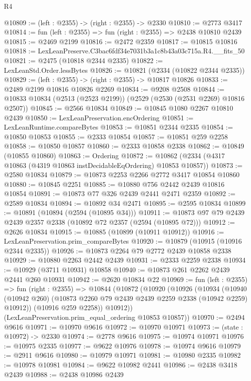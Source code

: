 \begin{lexlean}{R4}
\begin{coremodule}
@10809 := (left : @2355) -> (right : @2355) -> @2330
@10810 := @2773 @3417
@10814 := fun (left : @2355) => fun (right : @2355) => @2438 @10810 @2439
@10815 := @2469 @2199
@10816 := @2472 @2359
@10817 := @10815 @10816
@10818 := LexLeanPreserve.C3bac6fdf34e7031b3a1c8b43a03c715a.R4.__fits_50
@10821 := @2475 (@10818 @2344 @2335)
@10822 := LexLeanStd.Order.lessBytes
@10826 := @10821 (@2334 (@10822 @2344 @2335))
@10829 := (left : @2355) -> (right : @2355) -> @10817 @10826
@10833 := @2489 @2199 @10816 @10826 @2269
@10834 := @9208 @2508
@10844 := @10833 @10834 (@2513 (@2523 @2199)) (@2529 (@2530 (@2531 @2269) @10816 @2507))
@10845 := @2566 @10834
@10849 := @10845 @1080 @2267 @10810 @2439
@10850 := LexLeanPreservation.encOrdering
@10851 := LexLeanRuntime.compareBytes
@10853 := @10851 @2344 @2335
@10854 := @10850 @10853
@10855 := @2333 @10854
@10857 := @10851 @259 @2258
@10858 := @10850 @10857
@10860 := @2333 @10858 @2338
@10862 := @10849 (@10855 @10860)
@10863 := Ordering
@10872 := @10862 (@2334 (@4317 @10863 (@4319 @10863 instDecidableEqOrdering) @10853 @10857))
@10873 := @2580 @10834
@10879 := @10873 @2253 @2266 @2772 @3417 @10854 @10860
@10880 := @10845 @2251
@10885 := @10880 @756 @2442 @2439 @10816 @10854
@10891 := @10873 @77 @326 @2439 @2441 @2471 @2359
@10892 := @2589 @10834
@10894 := @10892 @34 @2471
@10895 := @2595 @10834
@10899 := @10891 (@10894 (@2594 (@10895 @34)))
@10911 := @10873 @97 @79 @2439 @2439 @2357 @2338 (@10892 @72 @2357 (@2594 (@10895 @72)))
@10912 := @2626 @10834
@10915 := @10885 (@10899 (@10911 @10912))
@10916 := LexLeanPreservation.prim_compareBytes
@10920 := @10879 (@10915 (@10916 @2344 @2335))
@10926 := @10873 @2264 @79 @2772 @2439 @10858 @2338
@10929 := @10880 @2263 @2442 @2439
@10931 := @2333 @2259 @2338
@10934 := @10929 (@3711 @10931) @10858
@10940 := @10873 @261 @2262 @2439 @2441 @260 @10931
@10942 := @2620 @10834 @22
@10969 := fun (left : @2355) =>
  fun (right : @2355) =>
  @10844
    (@10872
      (@10920
        (@10926
          (@10934
            (@10940 (@10942 @260) (@10873 @2260 @79 @2439 @2439 @2259 @2338 (@10942 @2259) @10912))
            (@10916 @259 @2258))
          @10912))
      (LexLeanPreservation.prim_equal_ordering @10853 @10857))
@10970 := @2494 @9616
@10971 := @10970 @9616
@10972 := @10970 @10971
@10973 := (state : @10972) -> @2330
@10974 := @2778 @9616
@10975 := @10974 @10971
@10976 := @10975 @2335
@10977 := @9622 @10976
@10978 := @10974 @9616
@10979 := @2911 @9616
@10980 := @10979 @10971
@10981 := @10980 @2335
@10982 := @10978 @10981
@10984 := @9622 @10982 @2441
@10986 := @2438 @3418 @2439
@10988 := @2438 @10986 @2439

\end{coremodule}
\end{lexlean}
